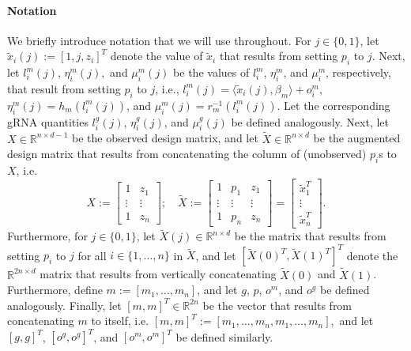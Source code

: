 \documentclass[12pt]{article}
\begin{document}
\paragraph{Notation} We briefly introduce notation that we will use throughout. For $j \in \{0,1\}$, let $\tilde{x}_i(j) := [1, j, z_i]^T$ denote the value of $\tilde{x}_i$ that results from setting $p_i$ to $j$. Next, let  $l^m_i(j)$, $\eta^m_i(j),$ and $\mu^m_i(j)$ be the values of $l^m_i$, $\eta^m_i$, and $\mu^m_i$, respectively, that result from setting $p_i$ to $j$, i.e.,
$l^m_i(j) = \langle \tilde{x}_i(j), \beta_m \rangle + o^m_i$, $\eta^m_i(j) = h_m(l^m_i(j))$, and
$\mu_i^m(j) = r_m^{-1}(l^m_i(j)).$ Let the corresponding gRNA quantities $l^g_i(j)$, $\eta_i^g(j)$, and $\mu^g_i(j)$ be defined analogously. Next, let $X \in \mathbb{R}^{n \times {d-1}}$ be the observed design matrix, and let $\tilde{X} \in \mathbb{R}^{n \times d}$ be the augmented design matrix that results from concatenating the column of (unobserved) $p_i$s to $X$, i.e.
$$ X := \begin{bmatrix} 
1 & z_1 \\
\vdots & \vdots \\
1 & z_n
\end{bmatrix}; \quad 
\tilde{X}  := 
\begin{bmatrix}
1 & p_1 & z_1 \\
\vdots & \vdots & \vdots \\
1 & p_n & z_n
\end{bmatrix} = \begin{bmatrix}
\tilde{x}_1^T \\ \vdots \\ \tilde{x}_n^T
\end{bmatrix}.
$$ 
Furthermore, for $j \in \{0,1\}$, let $\tilde{X}(j) \in \mathbb{R}^{n \times d}$ be the matrix that results from setting $p_i$ to $j$ for all $i \in \{1, \dots, n\}$ in $\tilde{X}$, and let  $[\tilde{X}(0)^T, \tilde{X}(1)^T]^T$ denote the $\mathbb{R}^{2n \times d}$ matrix that results from vertically concatenating $\tilde{X}(0)$ and $\tilde{X}(1)$. Furthermore, define $m := [m_1, \dots, m_n]$, and let $g$, $p$, $o^m$, and $o^g$ be defined analogously. Finally, let $[m,m]^T \in \mathbb{R}^{2n}$ be the vector that results from concatenating $m$ to itself, i.e.
$[m,m]^T := [m_1, \dots, m_n, m_1, \dots, m_n],$ and let $[g,g]^T$, $[o^g,o^g]^T$, and $[o^m,o^m]^T$ be defined similarly. 
\end{document}
